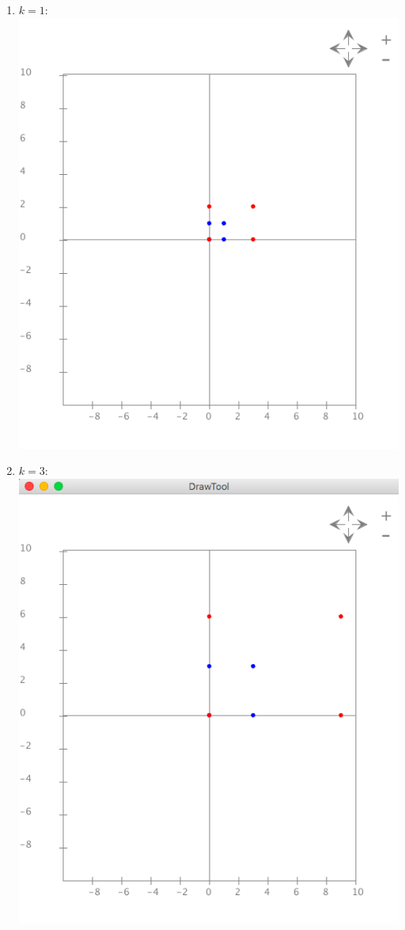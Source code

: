 \documentclass{article}
\begin{document}
\begin{enumerate}
\item $k=1$:\\
\includegraphics[scale=0.4]{exercise8_k1}\\
\item $k=3$:\\
\includegraphics[scale=0.4]{exercise8_k3}\\

\end{enumerate}
\end{document}
